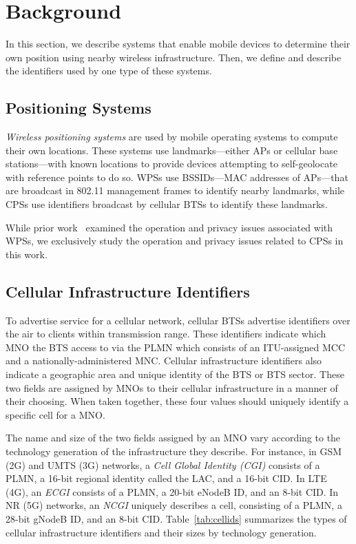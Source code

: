 \section{Background}
\label{sec:background}

In this section, we describe systems that enable mobile devices to determine
their own position using nearby wireless infrastructure. Then, we define and
describe the identifiers used by one type of these systems.

\subsection{Positioning Systems}
\label{sec:positioning}

\emph{Wireless positioning systems} are used by mobile operating systems to
compute their own locations. These systems use landmarks---either \wifi \acp{AP}
or cellular base stations---with known locations to provide devices attempting
to self-geolocate with reference points to do so. \acp{WPS} use
\acp{BSSID}---MAC addresses of \wifi \acp{AP}---that are broadcast in 802.11
\wifi management frames to identify nearby landmarks, while \acp{CPS} use
identifiers broadcast by cellular \acp{BTS} to identify these landmarks.

While prior work~\cite{rye2024surveilling, han2022location,
tippenhauer2009attacks} examined the operation and privacy issues associated
with \acp{WPS}, we exclusively study the operation and privacy issues related to
\acp{CPS} in this work.

\subsection{Cellular Infrastructure Identifiers} 
\label{sec:bsids}

To advertise service for a cellular network, cellular \acp{BTS} advertise
identifiers over the air to clients within transmission range. These identifiers
indicate which \ac{MNO} the \ac{BTS} access to via the
\ac{PLMN} which consists of an \ac{ITU}-assigned \ac{MCC} and a
nationally-administered \ac{MNC}. Cellular infrastructure identifiers also
indicate a geographic area and unique identity of the \ac{BTS} or \ac{BTS}
sector. These two fields are assigned by \acp{MNO} to their cellular
infrastructure in a manner of their choosing.  When taken together, these four
values should uniquely identify a specific cell for a \ac{MNO}.

The name and size of the two fields assigned by an \ac{MNO} vary according to
the technology generation of the infrastructure they describe. For instance, in
\ac{GSM} (2G) and \ac{UMTS} (3G) networks, a \emph{Cell Global Identity (CGI)}
consists of a PLMN, a 16-bit regional identity called the \ac{LAC}, and a 16-bit
\ac{CID}. In \ac{LTE} (4G), an \emph{\ac{ECGI}} consists of a PLMN, a 20-bit
eNodeB ID, and an 8-bit \ac{CID}. In \ac{NR} (5G) networks, an \emph{\ac{NCGI}}
uniquely describes a cell, consisting of a PLMN, a 28-bit gNodeB ID, and an
8-bit \ac{CID}. Table~\ref{tab:cellids} summarizes the types of cellular
infrastructure identifiers and their sizes by technology generation.

